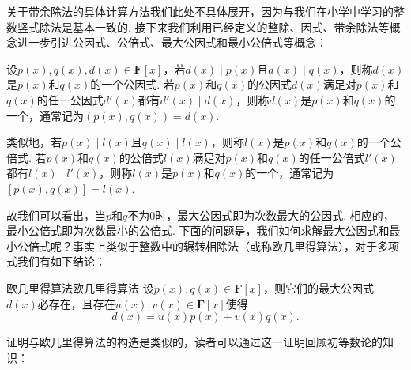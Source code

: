 关于带余除法的具体计算方法我们此处不具体展开，因为与我们在小学中学习的整数竖式除法是基本一致的. 接下来我们利用已经定义的整除、因式、带余除法等概念进一步引进公因式、公倍式、最大公因式和最小公倍式等概念：
\begin{definition}{}{}
    设$p(x),q(x),d(x)\in\mathbf{F}[x]$，若$d(x) \mid p(x)$且$d(x) \mid q(x)$，则称$d(x)$是$p(x)$和$q(x)$的一个公因式. 若$p(x)$和$q(x)$的公因式$d(x)$满足对$p(x)$和$q(x)$的任一公因式$d'(x)$都有$d'(x) \mid d(x)$，则称$d(x)$是$p(x)$和$q(x)$的一个，通常记为$(p(x),q(x))=d(x)$.

    类似地，若$p(x) \mid l(x)$且$q(x) \mid l(x)$，则称$l(x)$是$p(x)$和$q(x)$的一个公倍式. 若$p(x)$和$q(x)$的公倍式$l(x)$满足对$p(x)$和$q(x)$的任一公倍式$l'(x)$都有$l(x) \mid l'(x)$，则称$l(x)$是$p(x)$和$q(x)$的一个，通常记为$[p(x),q(x)]=l(x)$.
\end{definition}
故我们可以看出，当$p$和$q$不为0时，最大公因式即为次数最大的公因式. 相应的，最小公倍式即为次数最小的公倍式. 下面的问题是，我们如何求解最大公因式和最小公倍式呢？事实上类似于整数中的辗转相除法（或称欧几里得算法），对于多项式我们有如下结论：
\begin{theorem}{欧几里得算法}{欧几里得算法}
    设$p(x),q(x)\in\mathbf{F}[x]$，则它们的最大公因式$d(x)$必存在，且存在$u(x),v(x)\in\mathbf{F}[x]$使得
    \begin{equation}
        d(x)=u(x)p(x)+v(x)q(x).
    \end{equation}
\end{theorem}
证明与欧几里得算法的构造是类似的，读者可以通过这一证明回顾初等数论的知识：
